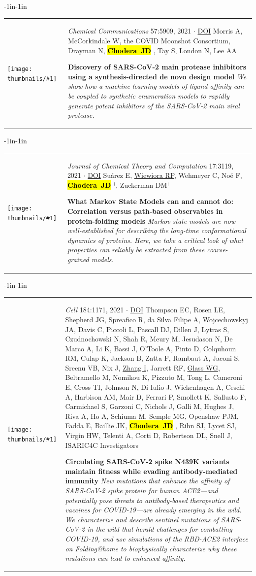 \documentclass[10pt]{article}
\newcommand{\newarticle}[7]{
\begin{adjustwidth}{-1in}{-1in}  
\begin{tabular}{p{0.9in}p{7in}}
\parbox[c]{0.9in}{\texttt{[image: thumbnails/\#1]}} & \parbox[c]{6in}{\setstretch{0.9} {\small #4} $\cdot$ \href{#6}{#5} \\ {\footnotesize {#2}} \\ \raggedright { \bf\nohyphens{#3}}  \\ {\footnotesize\emph {#7}}} %
\end{tabular}
\end{adjustwidth}
\vspace{0.2in}
}
\newcommand{\jdc}{ {\bf \hl{Chodera~JD}} } %
\begin{document}
\newarticle{postera-ml-model}{Morris A, McCorkindale W, the COVID Moonshot Consortium, Drayman N, \jdc, Tay S, London N, Lee AA}{Discovery of SARS-CoV-2 main protease inhibitors using a synthesis-directed de novo design model}{\emph{Chemical Communications} 57:5909, 2021}{DOI}{https://doi.org/10.1039/D1CC00050K}{We show how a machine learning models of ligand affinity can be coupled to synthetic enumeration models to rapidly generate potent inhibitors of the SARS-CoV-2 main viral protease.}

\newarticle{what-can-msms-do}{Su\'{a}rez E, \underline{Wiewiora RP}, Wehmeyer C, No\'{e} F, \jdc$^\ddag$, Zuckerman DM$^\ddag$}{What Markov State Models can and cannot do: Correlation versus path-based observables in protein-folding models}{\emph{Journal of Chemical Theory and Computation} 17:3119, 2021}{DOI}{https://doi.org/10.1021/acs.jctc.0c01154}{Markov state models are now well-established for describing the long-time conformational dynamics of proteins. Here, we take a critical look of what properties can reliably be extracted from these coarse-grained models.}

\newarticle{vir-cell-xray.jpg}{Thompson EC, Rosen LE, Shepherd JG, Spreafico R, da Silva Filipe A, Wojcechowskyj JA, Davis C, Piccoli L, Pascall DJ, Dillen J, Lytras S, Czudnochowski N, Shah R, Meury M, Jesudason N, De Marco A, Li K, Bassi J, O'Toole A, Pinto D, Colquhoun RM, Culap K, Jackson B, Zatta F, Rambaut A, Jaconi S, Sreenu VB, Nix J, \underline{Zhang I}, Jarrett RF, \underline{Glass WG}, Beltramello M, Nomikou K, Pizzuto M, Tong L, Cameroni E, Cross TI, Johnson N, Di Iulio J, Wickenhagen A, Ceschi A, Harbison AM, Mair D, Ferrari P, Smollett K, Sallusto F, Carmichael S, Garzoni C, Nichols J, Galli M, Hughes J, Riva A, Ho A, Schiuma M, Semple MG, Openshaw PJM, Fadda E, Baillie JK, \jdc, Rihn SJ, Lycet SJ, Virgin HW, Telenti A, Corti D, Robertson DL, Snell J, ISARIC4C Investigators}{Circulating SARS-CoV-2 spike N439K variants maintain fitness while evading antibody-mediated immunity}{\emph{Cell} 184:1171, 2021}{DOI}{https://doi.org/10.1016/j.cell.2021.01.037}{New mutations that enhance the affinity of SARS-CoV-2 spike protein for human ACE2—and potentially pose threats to antibody-based therapeutics and vaccines for COVID-19—are already emerging in the wild. We characterize and describe sentinel mutations of SARS-CoV-2 in the wild that herald challenges for combatting COVID-19, and use simulations of the RBD-ACE2 interface on Folding@home to biophysically characterize why these mutations can lead to enhanced affinity.}
\end{document}
